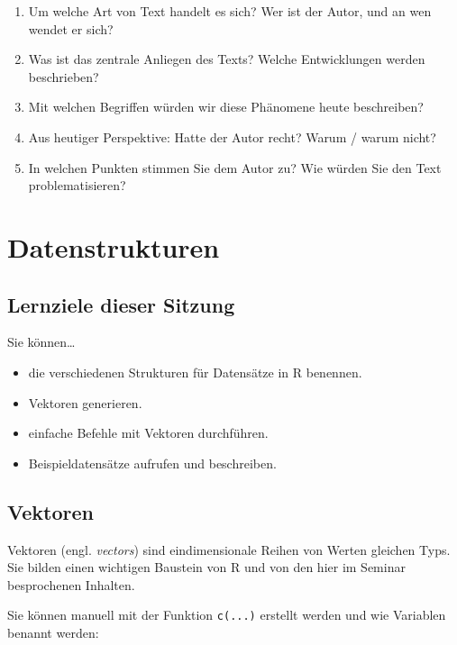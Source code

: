\documentclass[11pt,german,a4paper]{article}
\providecommand{\tightlist}{%
  \setlength{\itemsep}{0pt}\setlength{\parskip}{0pt}}
\begin{document}
\begin{enumerate}
\def\labelenumi{\arabic{enumi}.}
\tightlist
\item
  Um welche Art von Text handelt es sich? Wer ist der Autor, und an wen wendet er sich?
\item
  Was ist das zentrale Anliegen des Texts? Welche Entwicklungen werden beschrieben?
\item
  Mit welchen Begriffen würden wir diese Phänomene heute beschreiben?
\item
  Aus heutiger Perspektive: Hatte der Autor recht? Warum / warum nicht?
\item
  In welchen Punkten stimmen Sie dem Autor zu? Wie würden Sie den Text problematisieren?
\end{enumerate}

\hypertarget{datenstrukturen}{%
\section{Datenstrukturen}\label{datenstrukturen}}

\hypertarget{lernziele-dieser-sitzung}{%
\subsection{Lernziele dieser Sitzung}\label{lernziele-dieser-sitzung}}

Sie können\ldots{}

\begin{itemize}
\tightlist
\item
  die verschiedenen Strukturen für Datensätze in R benennen.
\item
  Vektoren generieren.
\item
  einfache Befehle mit Vektoren durchführen.
\item
  Beispieldatensätze aufrufen und beschreiben.
\end{itemize}

\hypertarget{vektoren}{%
\subsection{Vektoren}\label{vektoren}}

Vektoren (engl. \emph{vectors}) sind eindimensionale Reihen von Werten gleichen Typs. Sie bilden einen wichtigen Baustein von R und von den hier im Seminar besprochenen Inhalten.

Sie können manuell mit der Funktion \texttt{c(...)} erstellt werden und wie Variablen benannt werden:
\end{document}
